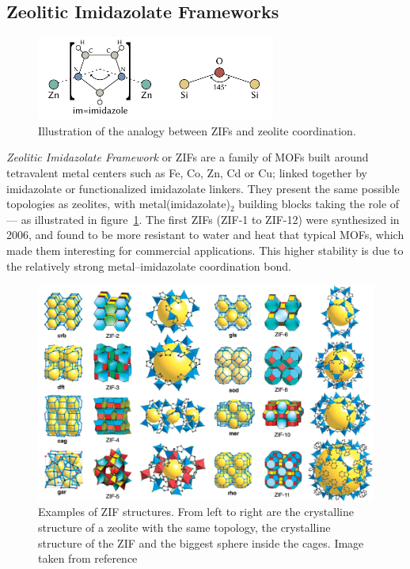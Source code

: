 \documentclass[thesis]{subfiles}
\begin{document}
\subsection{Zeolitic Imidazolate Frameworks}

\begin{figure}[ht]
    \centering
    \includegraphics[width=0.7\textwidth]{figures/images/zeolite-to-zif}
    \caption{Illustration of the analogy between ZIFs and zeolite coordination.}
    \label{fig:zeolite-to-zif}
\end{figure}

\emph{Zeolitic Imidazolate Framework} or ZIFs are a family of MOFs built around
tetravalent  metal centers such as Fe, Co, Zn, Cd or Cu; linked
together by imidazolate or functionalized imidazolate linkers. They present the
same possible topologies as zeolites, with metal(imidazolate)$_2$ building
blocks taking the role of  --- as illustrated in
figure~\ref{fig:zeolite-to-zif}. The first ZIFs (ZIF-1 to ZIF-12) were
synthesized in 2006\cite{Park2006}, and found to be more resistant to water and
heat that typical MOFs, which made them interesting for commercial applications.
This higher stability is due to the relatively strong metal--imidazolate
coordination bond.

\begin{figure}[b]
    \centering
    \includegraphics[width=\textwidth]{figures/cited/zif-examples}
    \caption{Examples of ZIF structures. From left to right are the crystalline
    structure of a zeolite with the same topology, the crystalline structure of
    the ZIF and the biggest sphere inside the cages. Image taken from
    reference~\cite{Park2006}}
    \label{fig:zif-examples}
\end{figure}
\end{document}

